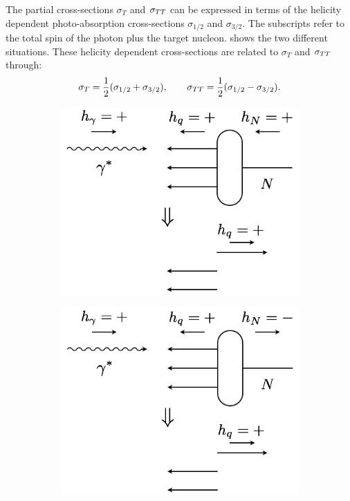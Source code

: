 The partial cross-sections $\sigma_T$ and $\sigma_{TT}$ can be expressed in terms of the helicity dependent photo-absorption cross-sections $\sigma_{1/2}$ and $\sigma_{3/2}$. The subscripts refer to the total spin of the photon plus the target nucleon.  shows the two different situations. These helicity dependent cross-sections are related to $\sigma_T$ and $\sigma_{TT}$ through:
\begin{equation} \label{C2S4E5}
\sigma_T = \frac{1}{2}(\sigma_{1/2}+\sigma_{3/2}), \qquad \sigma_{TT} = \frac{1}{2}(\sigma_{1/2}-\sigma_{3/2}).
\end{equation}

\begin{figure}[tb!]
  \centering
  \begin{subfigure}[t]{0.4\textwidth}
    \includegraphics[width=\textwidth]{figs/photon-absorption-a.png}
    \subcaption{{}\label{C2S4F1A}}
  \end{subfigure}
  \qquad
  \qquad
  \begin{subfigure}[t]{0.4\textwidth}
    \includegraphics[width=\textwidth]{figs/photon-absorption-b.png}

\end{subfigure}
\end{figure}
